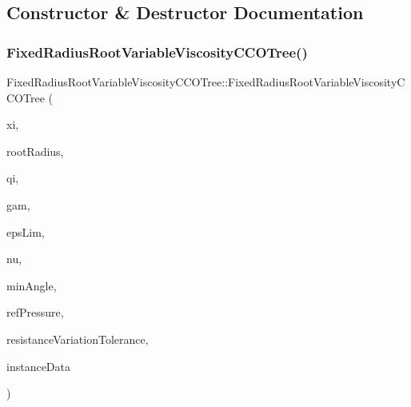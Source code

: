 \subsection{Constructor \& Destructor Documentation}
\mbox{\label{class_fixed_radius_root_variable_viscosity_c_c_o_tree_a8b446e14c64faeedfe2b925ec227b5d8}} 
\subsubsection{\texorpdfstring{Fixed\+Radius\+Root\+Variable\+Viscosity\+C\+C\+O\+Tree()}{FixedRadiusRootVariableViscosityCCOTree()}}
{\footnotesize\ttfamily Fixed\+Radius\+Root\+Variable\+Viscosity\+C\+C\+O\+Tree\+::\+Fixed\+Radius\+Root\+Variable\+Viscosity\+C\+C\+O\+Tree (\begin{DoxyParamCaption}\item[{\mbox{\hyperlink{structpoint}{point}}}]{xi,  }\item[{double}]{root\+Radius,  }\item[{double}]{qi,  }\item[{\mbox{\hyperlink{class_abstract_constraint_function}{Abstract\+Constraint\+Function}}$<$ double, int $>$ $\ast$}]{gam,  }\item[{\mbox{\hyperlink{class_abstract_constraint_function}{Abstract\+Constraint\+Function}}$<$ double, int $>$ $\ast$}]{eps\+Lim,  }\item[{\mbox{\hyperlink{class_abstract_constraint_function}{Abstract\+Constraint\+Function}}$<$ double, int $>$ $\ast$}]{nu,  }\item[{double}]{min\+Angle,  }\item[{double}]{ref\+Pressure,  }\item[{double}]{resistance\+Variation\+Tolerance,  }\item[{\mbox{\hyperlink{class_generator_data}{Generator\+Data}} $\ast$}]{instance\+Data }\end{DoxyParamCaption})}

